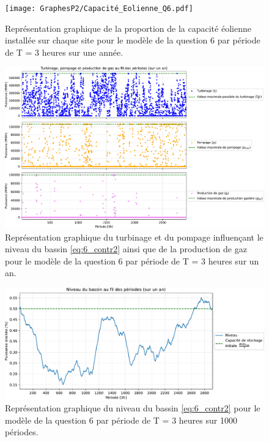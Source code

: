 \documentclass{article}
\begin{document}
\begin{figure}[h!]
    \centering
    \texttt{[image: GraphesP2/Capacité\_Eolienne\_Q6.pdf]}
    \caption{Représentation graphique de la proportion de la capacité éolienne installée sur chaque site pour le modèle de la question 6 par période
    de T = 3 heures sur une année.}
    \label{fig:Q60}
\end{figure}

\begin{figure}[H]
    \centering
    \includegraphics[scale=0.6]{GraphesP2/Productions_Q6.pdf}
    \caption{Représentation graphique du turbinage et du pompage
    influençant le niveau du bassin \eqref{eq:6_contr2} ainsi que de la production de gaz pour le modèle de la question 6 par période de T = 3 heures sur un an.} 
    \label{fig:Q61}
\end{figure}

\begin{figure}[h!]
    \centering
    \includegraphics[scale=0.6]{GraphesP2/Niveau_Bassin_Q6.pdf}
    \caption{Représentation graphique du niveau du bassin \eqref{eq:6_contr2} pour le modèle 
    de la question 6 par période de T = 3 heures sur 1000 périodes.} 
    \label{fig:Q62}
\end{figure}
\end{document}
